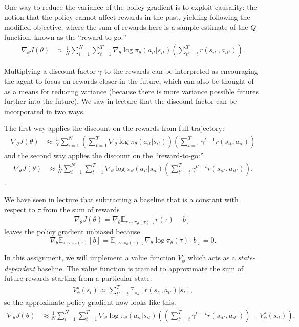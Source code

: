 \documentclass[12pt]{article}
\begin{document}
One way to reduce the variance of the policy gradient is to exploit causality: the notion that the policy cannot affect rewards in the past, yielding following the modified objective, where the sum of rewards here is a sample estimate of the $Q$ function, known as the ``reward-to-go:''
\begin{align}
\nabla_\theta J(\theta) &\approx \frac{1}{N} \sum_{i=1}^N \sum_{t=1}^T \nabla_\theta \log \pi_\theta(a_{it} | s_{it})\left(\sum_{t'=t}^T r(s_{it'}, a_{it'})\right).
\end{align}

Multiplying a discount factor $\gamma$ to the rewards can be interpreted as encouraging the agent to focus on rewards closer in the future, which can also be thought of as a means for reducing variance (because there is more variance possible futures further into the future). We saw in lecture that the discount factor can be incorporated in two ways.

The first way applies the discount on the rewards from full trajectory:
\begin{align} \label{discount_full}
\nabla_\theta J(\theta) &\approx \frac{1}{N} \sum_{i=1}^N \left(\sum_{t=1}^T \nabla_\theta \log \pi_\theta(a_{it} | s_{it})\right)\left(\sum_{t=1}^T \gamma^{t-1} r(s_{it}, a_{it})\right)
\end{align}
and the second way applies the discount on the ``reward-to-go:''
\begin{align} \label{discount_rtg}
\nabla_\theta J(\theta) &\approx \frac{1}{N} \sum_{i=1}^N \sum_{t=1}^T \nabla_\theta \log \pi_\theta(a_{it} | s_{it})\left(\sum_{t'=t}^T \gamma^{t'-t} r(s_{it'}, a_{it'})\right).
\end{align}.

We have seen in lecture that subtracting a baseline that is a constant with respect to $\tau$ from the sum of rewards
\begin{align} \label{constant_wrt_tau}
\nabla_\theta J(\theta) = \nabla_\theta \mathbb{E}_{\tau \sim \pi_\theta(\tau)} \left[r(\tau) - b\right]\
\end{align}
leaves the policy gradient unbiased because $$\nabla_\theta \mathbb{E}_{\tau \sim \pi_\theta(\tau)} \left[b\right] = \mathbb{E}_{\tau \sim \pi_\theta(\tau)} \left[\nabla_\theta \log \pi_\theta(\tau) \cdot b\right] = 0.$$

In this assignment, we will implement a value function $V_\phi^\pi$ which acts as a \textit{state-dependent} baseline. The value function is trained to approximate the sum of future rewards starting from a particular state:
\begin{align}
V_\phi^\pi(s_t) \approx \sum_{t'=t}^T \mathbb{E}_{\pi_\theta} \left[r(s_{t'}, a_{t'}) | s_t\right],
\end{align}
so the approximate policy gradient now looks like this:
\begin{align} \label{state_dependent_baseline}
\nabla_\theta J(\theta) &\approx \frac{1}{N} \sum_{i=1}^N \sum_{t=1}^T \nabla_\theta \log \pi_\theta(a_{it} | s_{it})\left(\left(\sum_{t'=t}^T \gamma^{t'-t} r(s_{it'}, a_{it'})\right) - V_\phi^\pi\left(s_{it}\right)\right).
\end{align}
\end{document}
